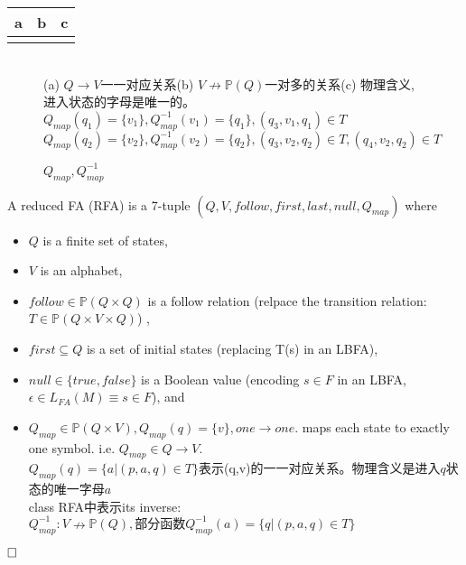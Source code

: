 \begin{tabular}{|c|c|c|}
	\hline 
	a & b & c \\ 
	\hline 
	\multicolumn{2}{|c|}{} &  \\ 
	\hline 
\end{tabular} 
\begin{figure}[htbp] 
	\\
	(a) $Q\to V$一一对应关系\quad (b) $V \nrightarrow \mathbb{P}(Q)$一对多的关系\quad (c) 物理含义,进入状态的字母是唯一的。\\
	$Q_{map}(q_1)=\{v_1\},Q_{map}^{-1}(v_1)=\{q_1\},(q_3,v_1,q_1)\in T$\\
	$Q_{map}(q_2)=\{v_2\},Q_{map}^{-1}(v_2)=\{q_2\},(q_3,v_2,q_2)\in T,(q_4,v_2,q_2)\in T$
	
	\caption{$Q_{map},Q_{map}^{-1}$}
\end{figure}

\begin{definition}[RFA] 
	A reduced FA (RFA) is a 7-tuple $(Q,V,follow,first,last,null,Q_{map})$ where
	\begin{itemize}
		\item $Q$ is a finite set of states,
		\item $V$ is an alphabet,
		\item $follow\in \mathbb{P}(Q\times Q)$ is a follow relation (relpace the transition relation:  $T\in \mathbb{P}(Q\times V\times Q)$) , 
		\item $first\subseteq Q$ is a set of initial states (replacing T(s) in an LBFA),
		\item $null\in \{true,false\}$ is a Boolean value (encoding $s\in F$ in an LBFA,$\epsilon\in L_{FA}(M)\equiv s\in F$), and
		\item $Q_{map}\in\mathbb{P}(Q\times V),Q_{map}(q)=\{v\},one\to one.$ maps
		each state to exactly one symbol. i.e. $Q_{map}\in Q\to V$.\\
		$Q_{map}(q) = \{a | (p,a,q) \in T\}$表示(q,v)的一一对应关系。物理含义是进入$q$状态的唯一字母$a$\\	
	    class RFA中表示its inverse: $Q_{map}^{-1}: V \nrightarrow \mathbb{P}(Q),\text{部分函数} Q_{map}^{-1}(a) = \{q|(p,a,q) \in T\}$\\
	\end{itemize}   $\hfill\square$
\end{definition}

